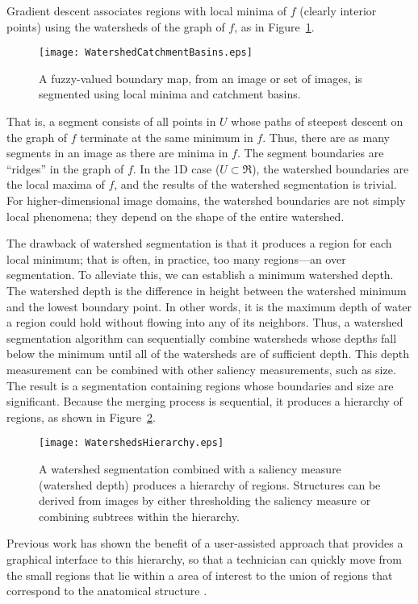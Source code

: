 Gradient descent associates regions with local minima of $f$ (clearly interior
points) using the watersheds of the graph of $f$, as in
Figure~\ref{fig:segment}.
\begin{figure}
\centering
\texttt{[image: WatershedCatchmentBasins.eps]}
\caption[Watershed Catchment Basins]{A fuzzy-valued boundary map, from an image
  or set of images, is segmented using local minima and catchment basins.}
\protect\label{fig:segment}
\end{figure}
That is, a segment consists of all points in $U$ whose paths of steepest
descent on the graph of $f$ terminate at the same minimum in $f$.  Thus, there
are as many segments in an image as there are minima in $f$.  The segment
boundaries are ``ridges'' \cite{Koenderink1979,Koenderink1993,Eberly1996} in
the graph of $f$.  In the 1D case ($U \subset \Re$), the watershed boundaries
are the local maxima of $f$, and the results of the watershed segmentation is
trivial.  For higher-dimensional image domains, the watershed boundaries are
not simply local phenomena; they depend on the shape of the entire watershed.

The drawback of watershed segmentation is that it produces a region
for each local minimum; that is often, in practice, too many
regions---an over segmentation.  To alleviate this, we can establish a
minimum watershed depth.  The watershed depth is the difference in
height between the watershed minimum and the lowest boundary point.
In other words, it is the maximum depth of water a region could hold
without flowing into any of its neighbors.  Thus, a watershed
segmentation algorithm can sequentially combine watersheds whose
depths fall below the minimum until all of the watersheds are of
sufficient depth.  This depth measurement can be combined with other
saliency measurements, such as size.  The result is a segmentation
containing regions whose boundaries and size are significant.  Because
the merging process is sequential, it produces a hierarchy of regions,
as shown in Figure~\ref{fig:watersheds}.
\begin{figure}
\centering
\texttt{[image: WatershedsHierarchy.eps]}
\caption[Watersheds Hierarchy of Regions]{A watershed segmentation combined
with a saliency measure (watershed depth) produces a hierarchy of regions.
Structures can be derived from images by either thresholding the saliency
measure or combining subtrees within the hierarchy.}
\protect\label{fig:watersheds}
\end{figure}
Previous work has shown the benefit of a user-assisted approach that provides
a graphical interface to this hierarchy, so that a technician can quickly move
from the small regions that lie within a area of interest to the union of
regions that correspond to the anatomical structure \cite{Yoo1991}.

